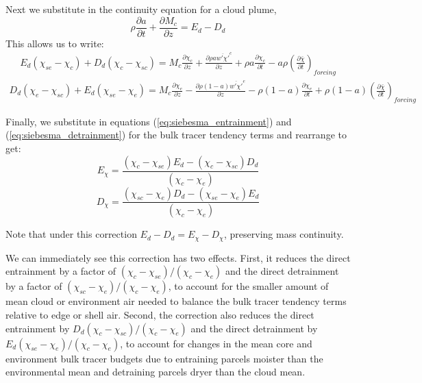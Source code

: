 \documentclass[draft,grl]{agutex}
\begin{document}
\begin{article}
Next we substitute in the continuity equation for a cloud plume,
\begin{equation}
   \label{eq:continuity}
   \rho \frac{\partial a}{\partial t} 
   + \frac{\partial M_c}{\partial z} = E_d - D_d
\end{equation}
This allows us to write:
\begin{eqnarray}
  \label{eq:entrainment_derivation_2}
    E_d (\chi_{se} - \chi_c) + D_d (\chi_c - \chi_{sc}) 
    = M_c \frac{\partial \chi_c}{\partial z}
    + \frac{\partial \rho a \overline{w' \chi'}^c}{\partial z} 
    + \rho a \frac{\partial \chi_c}{\partial t}
    - a \rho \left(\frac{\partial \bar{\chi}}{\partial t}\right)_{forcing}
\end{eqnarray}
\begin{eqnarray}
  \label{eq:detrainment_derivation_2}
    D_d (\chi_e - \chi_{sc}) + E_d (\chi_{se} - \chi_e)
    = M_c \frac{\partial \chi_e}{\partial z}
    - \frac{\partial \rho (1 - a) \overline{w' \chi'}^e}{\partial z} 
    - \rho (1 - a) \frac{\partial \chi_e}{\partial t}
    + \rho (1 - a) \left(\frac{\partial \bar{\chi}}{\partial t}\right)_{forcing}
\end{eqnarray}

Finally, we substitute in equations (\ref{eq:siebesma_entrainment}) and 
(\ref{eq:siebesma_detrainment}) for the bulk tracer tendency terms and 
rearrange to get:
\begin{equation}
  \label{eq:corrected_entrainment}
    E_{\chi} = \frac{(\chi_{c} - \chi_{se})E_d - (\chi_{c} - \chi_{sc})D_d}
             {(\chi_{c} - \chi_{e})}
\end{equation}
\begin{equation}
  \label{eq:corrected_detrainment}
    D_{\chi} = \frac{(\chi_{sc} - \chi_{e})D_d - (\chi_{se} - \chi_{e})E_d}
             {(\chi_{c} - \chi_{e})}
\end{equation}

Note that under this correction $E_d-D_d = E_{\chi}-D_{\chi}$, preserving 
mass continuity.

We can immediately see this correction has two effects.  First, it reduces
the direct entrainment by a factor of
$(\chi_{c} - \chi_{se})/(\chi_{c} - \chi_{e})$ and the direct detrainment 
by a factor of $(\chi_{sc} - \chi_{e})/(\chi_{c} - \chi_{e})$, to account for 
the smaller amount of mean cloud or environment air needed to balance the 
bulk tracer tendency terms relative to edge or shell air.  Second, the 
correction also reduces the direct entrainment by 
$D_d(\chi_{c} - \chi_{sc})/(\chi_{c} - \chi_{e})$ and the direct detrainment 
by $E_d(\chi_{se} - \chi_{e})/(\chi_{c} - \chi_{e})$, to account for changes 
in the mean core and environment bulk tracer budgets due to entraining 
parcels moister than the environmental mean and detraining parcels dryer than 
the cloud mean.  


\end{article}
\end{document}
